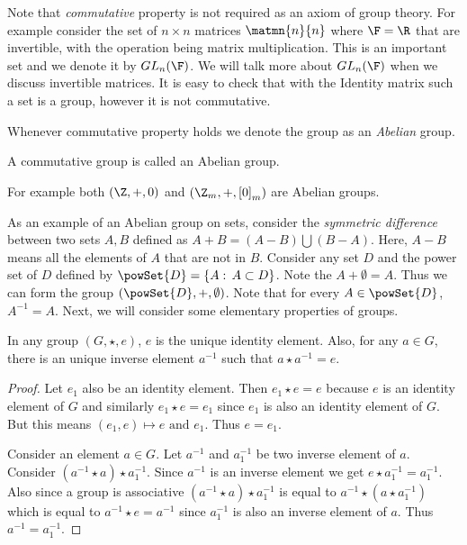 Note that \emph{commutative} property is not required as an axiom of group theory. For example
consider the set of $n \times n $ matrices $\matmn{n}{n}$ where $\F = \R$ that are invertible, with the
operation being matrix multiplication. This is an important set and we denote it by $GL_{n}(\F)$. We will talk
more about $GL_{n}(\F)$ when we discuss invertible matrices. It is easy to check that with the Identity 
matrix such a set is a group, however it is not commutative. 

Whenever commutative property holds we denote the group
as an \emph{Abelian} group.
\begin{Definition}[name=Abelian group]
    A commutative group is called an Abelian group.
\end{Definition}
For example both $\left(\Z,+,0\right)$ and
$\left(\Z_{m},+,{\left[0\right]}_{m}\right)$ are Abelian groups.

As an example of an Abelian group on sets, consider the \emph{symmetric difference} between two sets
$A,B$ defined as $A + B = \left(A - B\right) \bigcup \left(B - A\right)$. Here, $A - B$ means all the
elements of $A$ that are not in $B$. Consider any set $D$ and the power set of $D$ defined by
$\powSet{D} = \lbrace A: \, A \subset D \rbrace$. Note the $A + \emptyset = A$. Thus we can
form the group $\left(\powSet{D},+,\emptyset\right)$. Note that for every $ A \in
\powSet{D}$, $A^{-1} = A$. Next, we will consider some elementary properties of groups. 

\begin{Proposition}[name=Uniqueness of identity and inverse elements]
    In any group $\left(G,\star,e\right)$, $e$ is the unique identity element. Also, for any $a \in G$,
    there is an unique inverse element $a^{-1}$ such that $a \star a^{-1} = e$.
\end{Proposition}
\begin{proof}
    Let $e_1$ also be an identity element. Then $e_1 \star e = e$ because $e$ is an identity element
    of $G$ and similarly $e_1 \star e = e_1$ since $e_1$ is also an identity element of $G$. But
    this means $\left(e_1,e\right) \mapsto e \text{ and } e_1$. Thus $e = e_1$.

    Consider an element $a \in G$. Let $a^{-1}$ and $a_1^{-1}$ be two inverse element of $a$.
    Consider $\left(a^{-1} \star a\right)\star a_1^{-1}$. Since $a^{-1}$ is an inverse element we
    get $e \star a_1^{-1} = a_1^{-1}$. Also since a group is associative 
    $\left(a^{-1} \star a\right)\star a_1^{-1}$ is equal to 
    $a^{-1} \star \left(a \star a_1^{-1}\right)$ which is equal to $a^{-1} \star e = a^{-1}$ since
    $a_{1}^{-1}$ is also an inverse element of $a$. Thus $a^{-1} = a_1^{-1}$.
\end{proof}

